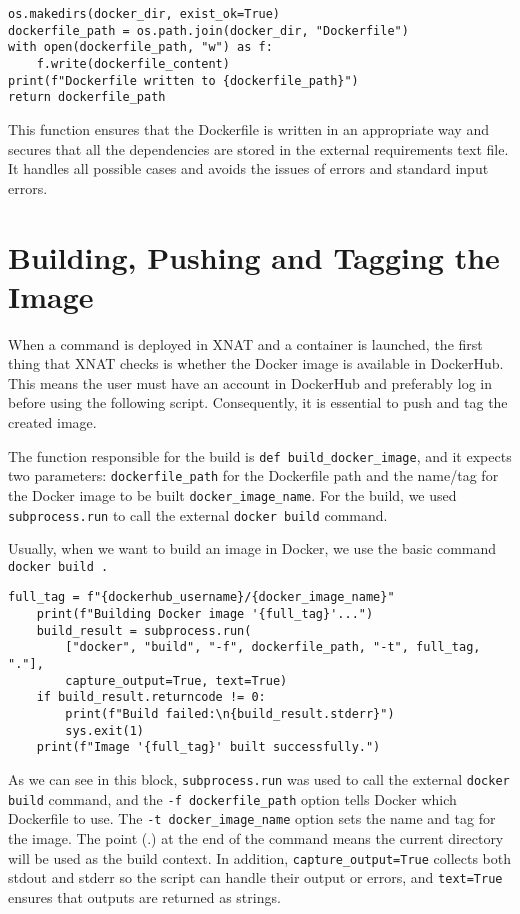 
\begin{lstlisting}
os.makedirs(docker_dir, exist_ok=True)
dockerfile_path = os.path.join(docker_dir, "Dockerfile")
with open(dockerfile_path, "w") as f:
    f.write(dockerfile_content)
print(f"Dockerfile written to {dockerfile_path}")
return dockerfile_path
\end{lstlisting}

This function ensures that the Dockerfile is written in an appropriate way and secures that all the dependencies are stored in the external requirements text file. It handles all possible cases and avoids the issues of errors and standard input errors.

\section{Building, Pushing and Tagging the Image}

When a command is deployed in XNAT and a container is launched, the first thing that XNAT checks is whether the Docker image is available in DockerHub. This means the user must have an account in DockerHub and preferably log in before using the following script. Consequently, it is essential to push and tag the created image.

The function responsible for the build is \texttt{def build\_docker\_image}, and it expects two parameters: \texttt{dockerfile\_path} for the Dockerfile path and the name/tag for the Docker image to be built \texttt{docker\_image\_name}. For the build, we used \texttt{subprocess.run} to call the external \texttt{docker build} command.


Usually, when we want to build an image in Docker, we use the basic command \texttt{docker build .}

\begin{lstlisting}
full_tag = f"{dockerhub_username}/{docker_image_name}"
    print(f"Building Docker image '{full_tag}'...")
    build_result = subprocess.run(
        ["docker", "build", "-f", dockerfile_path, "-t", full_tag, "."],
        capture_output=True, text=True)
    if build_result.returncode != 0:
        print(f"Build failed:\n{build_result.stderr}")
        sys.exit(1)
    print(f"Image '{full_tag}' built successfully.")
\end{lstlisting}
As we can see in this block, \texttt{subprocess.run} was used to call the external \texttt{docker build} command, and the \texttt{-f dockerfile\_path} option tells Docker which Dockerfile to use. The \texttt{-t docker\_image\_name} option sets the name and tag for the image. The point (.) at the end of the command means the current directory will be used as the build context. In addition, \texttt{capture\_output=True} collects both stdout and stderr so the script can handle their output or errors, and \texttt{text=True} ensures that outputs are returned as strings.

